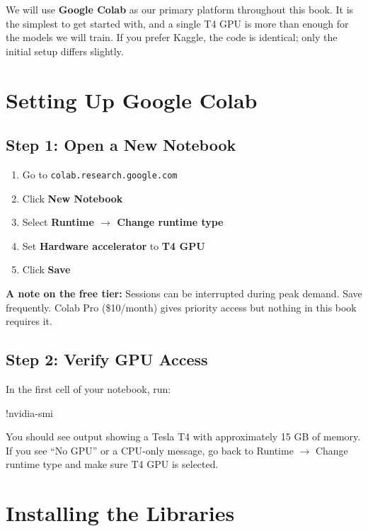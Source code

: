 \begin{chapterenv}
We will use \textbf{Google Colab} as our primary platform throughout this book. It is the simplest to get started with, and a single T4 GPU is more than enough for the models we will train. If you prefer Kaggle, the code is identical; only the initial setup differs slightly.

\section{Setting Up Google Colab}

\subsection{Step 1: Open a New Notebook}

\begin{enumerate}[nosep]
    \item Go to \texttt{colab.research.google.com}
    \item Click \textbf{New Notebook}
    \item Select \textbf{Runtime $\rightarrow$ Change runtime type}
    \item Set \textbf{Hardware accelerator} to \textbf{T4 GPU}
    \item Click \textbf{Save}
\end{enumerate}

\begin{tipbox}
\textbf{A note on the free tier:} Sessions can be interrupted during peak demand. Save frequently. Colab Pro (\$10/month) gives priority access but nothing in this book requires it.
\end{tipbox}

\subsection{Step 2: Verify GPU Access}

In the first cell of your notebook, run:

\begin{codeblock}[python]
!nvidia-smi
\end{codeblock}

You should see output showing a Tesla T4 with approximately 15 GB of memory. If you see ``No GPU'' or a CPU-only message, go back to Runtime $\rightarrow$ Change runtime type and make sure T4 GPU is selected.

\section{Installing the Libraries}


\end{chapterenv}
